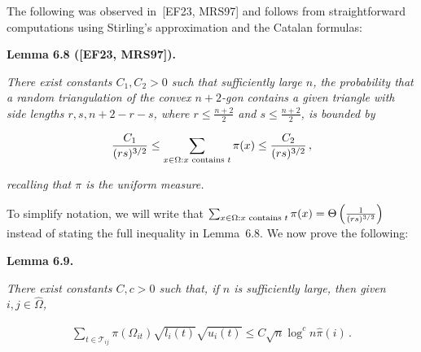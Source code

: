 The following was observed in [EF23, MRS97] and follows from straightforward computations using Stirling’s approximation and the Catalan formulas:\par





\par\medskip\noindent\textbf{\textbf{Lemma 6.8}\textbf{ }([EF23, MRS97])\textbf{.}}\par



\emph{There exist constants $C_{1},C_{2}>0$ such that sufficiently large $n$, the probability that a random triangulation of the convex $n+2$-gon contains a given triangle with side lengths $r,s,n+2-r-s$, where $r\leq\frac{n+2}{2}$ and $s\leq\frac{n+2}{2}$, is bounded by}\par


\[\begin{gathered}
\frac{C_{1}}{(rs)^{3/2}}\leq\sum_{x\in\Omega:x\textnormal{ contains }t}\pi(x)\leq\frac{C_{2}}{(rs)^{3/2}}\,,
\end{gathered}\]


\emph{recalling that $\pi$ is the uniform measure.}\par






To simplify notation, we will write that $\sum_{x\in\Omega:x\textnormal{ contains }t}\pi(x)=\Theta\left(\frac{1}{(rs)^{3/2}}\right)$ instead of stating the full inequality in Lemma 6.8. We now prove the following:\par





\par\medskip\noindent\textbf{\textbf{Lemma 6.9}\textbf{.}}\par



\emph{There exist constants $C,c>0$ such that, if $n$ is sufficiently large, then given $i,j\in\hat{\Omega}$,}\par


\[\begin{gathered}
\sum_{t\in\mathcal{T}_{ij}}\pi(\Omega_{it})\sqrt{l_{i}(t)}\sqrt{u_{i}(t)}\leq C\sqrt{n}\log^{c}n\hat{\pi}(i)\,.
\end{gathered}\]



